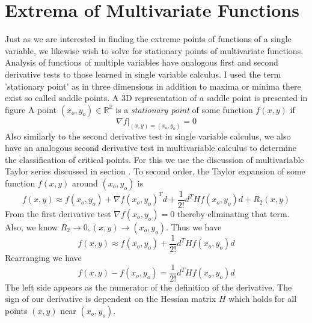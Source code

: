 \section{Extrema of Multivariate Functions}
Just as we are interested in finding the extreme points of functions of a single variable, we likewise wish to solve for stationary points of multivariate functions.
Analysis of functions of multiple variables have analogous first and second derivative tests to those learned in single variable calculus. 
I used the term 'stationary point' as in three dimensions in addition to maxima or minima there exist so called saddle points. 
A 3D representation of a saddle point is presented in figure 
 {A point $(x_o, y_o) \in \mathbb{R^2}$ is a \textit{stationary point} of some function $f(x,y)$ if
\[\nabla f \rvert_{(x, y) = (x_o, y_o)} = 0\]}
Also similarly to the second derivative test in single variable calculus, we also have an analogous second derivative test in multivariable calculus to determine the classification of critical points. For this we use the discussion of multivariable Taylor series discussed in section . To second order, the Taylor expansion of some function $f(x,y)$ around $(x_o, y_o)$ is
\[f(x,y) \approx f(x_o, y_o) + \nabla f(x_o, y_o)^T d + \frac{1}{2!}d^THf(x_o,y_o)d + R_2(x,y)\]
From the first derivative test $\nabla f(x_o, y_o) = 0$ thereby eliminating that term. Also, we know $R_2 \rightarrow 0, (x,y) \rightarrow (x_o, y_o)$. Thus we have
\[f(x,y) \approx f(x_o, y_o) + \frac{1}{2!}d^THf(x_o,y_o)d \]
Rearranging we have 
\[f(x,y) - f(x_o, y_o) = \frac{1}{2!}d^THf(x_o,y_o)d \]
The left side appears as the numerator of the definition of the derivative. The sign of our derivative is dependent on the Hessian matrix $H$ which holds for all points $(x,y)$ near $(x_o, y_o)$. 
